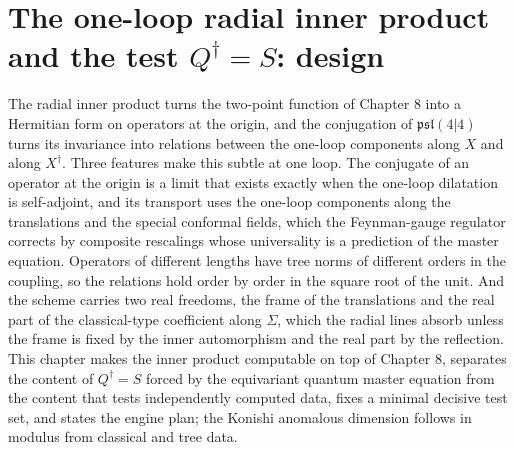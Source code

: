 \documentclass[11pt]{report}
\theoremstyle{plain}
\theoremstyle{definition}
\numberwithin{equation}{chapter}
\begin{document}
\setcounter{chapter}{10}
\chapter{The one-loop radial inner product and the test $Q^\dagger=S$: design}

The radial inner product turns the two-point function of Chapter 8 into a Hermitian form on operators at the origin, and the conjugation of $\mathfrak{psl}(4|4)$ turns its invariance into relations between the one-loop components along $X$ and along $X^\dagger$. Three features make this subtle at one loop. The conjugate of an operator at the origin is a limit that exists exactly when the one-loop dilatation is self-adjoint, and its transport uses the one-loop components along the translations and the special conformal fields, which the Feynman-gauge regulator corrects by composite rescalings whose universality is a prediction of the master equation. Operators of different lengths have tree norms of different orders in the coupling, so the relations hold order by order in the square root of the unit. And the scheme carries two real freedoms, the frame of the translations and the real part of the classical-type coefficient along $\Sigma$, which the radial lines absorb unless the frame is fixed by the inner automorphism and the real part by the reflection. This chapter makes the inner product computable on top of Chapter 8, separates the content of $Q^\dagger=S$ forced by the equivariant quantum master equation from the content that tests independently computed data, fixes a minimal decisive test set, and states the engine plan; the Konishi anomalous dimension follows in modulus from classical and tree data.
\end{document}
